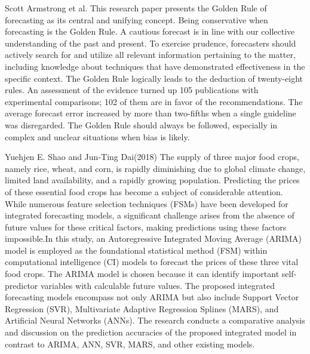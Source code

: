        Scott Armstrong et al. \cite{armstrong2015} This research paper presents the Golden Rule of forecasting as its central and unifying concept. Being conservative when forecasting is the Golden Rule. A cautious forecast is in line with our collective understanding of the past and present. To exercise prudence, forecasters should actively search for and utilize all relevant information pertaining to the matter, including knowledge about techniques that have demonstrated effectiveness in the specific context. The Golden Rule logically leads to the deduction of twenty-eight rules. An assessment of the evidence turned up 105 publications with experimental comparisons; 102 of them are in favor of the recommendations. The average forecast error increased by more than two-fifths when a single guideline was disregarded. The Golden Rule should always be followed, especially in complex and unclear situations when bias is likely. 
        
        Yuehjen E. Shao and Jun-Ting Dai(2018) \cite{shao2018} The supply of three major food crops, namely rice, wheat, and corn, is rapidly diminishing due to global climate change, limited land availability, and a rapidly growing population. Predicting the prices of these essential food crops has become a subject of considerable attention. While numerous feature selection techniques (FSMs) have been developed for integrated forecasting models, a significant challenge arises from the absence of future values for these critical factors, making predictions using these factors impossible.In this study, an Autoregressive Integrated Moving Average (ARIMA) model is employed as the foundational statistical method (FSM) within computational intelligence (CI) models to forecast the prices of these three vital food crops. The ARIMA model is chosen because it can identify important self-predictor variables with calculable future values. The proposed integrated forecasting models encompass not only ARIMA but also include Support Vector Regression (SVR), Multivariate Adaptive Regression Splines (MARS), and Artificial Neural Networks (ANNs). The research conducts a comparative analysis and discussion on the prediction accuracies of the proposed integrated model in contrast to ARIMA, ANN, SVR, MARS, and other existing models.
        
